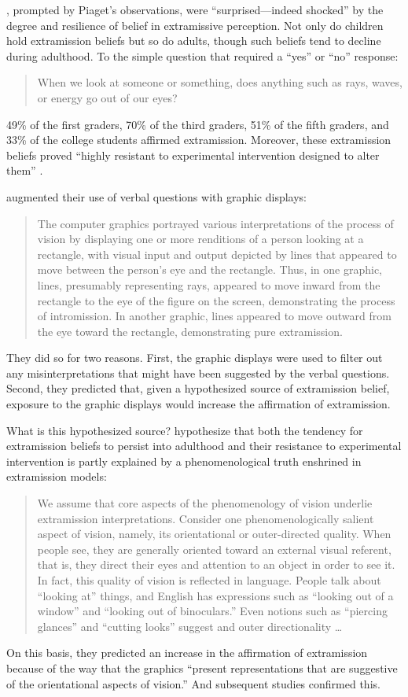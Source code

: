 \citet[138]{Winer:1996as}, prompted by Piaget's observations, were ``sur\-pri\-sed---indeed shocked'' by the degree and resilience of belief in extramissive perception. Not only do children hold extramission beliefs but so do adults, though such beliefs tend to decline during adulthood. To the simple question that required a ``yes'' or ``no'' response:
\begin{quote}
	When we look at someone or something, does anything such as rays, waves, or energy go out of our eyes?
\end{quote}
49\% of the first graders, 70\% of the third graders, 51\% of the fifth graders, and 33\% of the college students affirmed extramission. Moreover, these extramission beliefs proved ``highly resistant to experimental intervention designed to alter them'' \citep[138]{Winer:1996as}. 

\citet{Winer:1996as} augmented their use of verbal questions with graphic displays:
\begin{quote}
	The computer graphics portrayed various interpretations of the process of vision by displaying one or more renditions of a person looking at a rectangle, with visual input and output depicted by lines that appeared to move between the person's eye and the rectangle. Thus, in one graphic, lines, presumably representing rays, appeared to move inward from the rectangle to the eye of the figure on the screen, demonstrating the process of intromission. In another graphic, lines appeared to move outward from the eye toward the rectangle, demonstrating pure extramission. \citep[139]{Winer:1996as}
\end{quote}
They did so for two reasons. First, the graphic displays were used to filter out any misinterpretations that might have been suggested by the verbal questions. Second, they predicted that, given a hypothesized source of extramission belief, exposure to the graphic displays would increase the affirmation of extramission.

What is this hypothesized source? \citet{Winer:1996as} hypothesize that both the tendency for extramission beliefs to persist into adulthood and their resistance to experimental intervention is partly explained by a phenomenological truth enshrined in extramission models:
\begin{quote}
	We assume that core aspects of the phenomenology of vision underlie extramission interpretations. Consider one phenomenologically salient aspect of vision, namely, its orientational or outer-directed quality. When people see, they are generally oriented toward an external visual referent, that is, they direct their eyes and attention to an object in order to see it. In fact, this quality of vision is reflected in language. People talk about ``looking at'' things, and English has expressions such as ``looking out of a window'' and ``looking out of binoculars.'' Even notions such as ``piercing glances'' and ``cutting looks'' suggest and outer directionality \ldots\ \citep[140]{Winer:1996as}
\end{quote}
On this basis, they predicted an increase in the affirmation of extramission because of the way that the graphics ``present representations that are suggestive of the orientational aspects of vision.'' And subsequent studies confirmed this.

